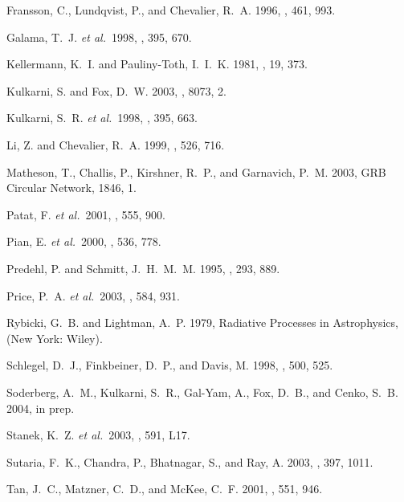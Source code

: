 \documentclass[12pt,preprint]{aastex}
\begin{document}
\begin{thebibliography}{}
{Fransson}, C., {Lundqvist}, P., and {Chevalier}, R.~A. 1996, \apj, 461, 993.

{Galama}, T.~J. {\it et al.}\  1998, \nat, 395, 670.

{Kellermann}, K.~I. and {Pauliny-Toth}, I.~I.~K. 1981, \araa, 19, 373.

{Kulkarni}, S. and {Fox}, D.~W. 2003, \iaucirc, 8073, 2.

{Kulkarni}, S.~R. {\it et al.}\  1998, \nat, 395, 663.

{Li}, Z. and {Chevalier}, R.~A. 1999, \apj, 526, 716.

{Matheson}, T., {Challis}, P., {Kirshner}, R.~P., and {Garnavich}, P.~M. 2003,
  GRB Circular Network, 1846, 1.

{Patat}, F. {\it et al.}\  2001, \apj, 555, 900.

{Pian}, E. {\it et al.}\  2000, \apj, 536, 778.

{Predehl}, P. and {Schmitt}, J.~H.~M.~M. 1995, \aap, 293, 889.

{Price}, P.~A. {\it et al.}\  2003, \apj, 584, 931.

{Rybicki}, G.~B. and {Lightman}, A.~P. 1979, { {Radiative Processes in
  Astrophysics}}, (New York: Wiley).

{Schlegel}, D.~J., {Finkbeiner}, D.~P., and {Davis}, M. 1998, \apj, 500, 525.

{Soderberg}, A.~M., {Kulkarni}, S.~R., {Gal-Yam}, A., {Fox}, D.~B., and
  {Cenko}, S.~B. 2004, in prep.

{Stanek}, K.~Z. {\it et al.}\  2003, \apjl, 591, L17.

{Sutaria}, F.~K., {Chandra}, P., {Bhatnagar}, S., and {Ray}, A. 2003, \aap,
  397, 1011.

{Tan}, J.~C., {Matzner}, C.~D., and {McKee}, C.~F. 2001, \apj, 551, 946.


\end{thebibliography}
\end{document}
